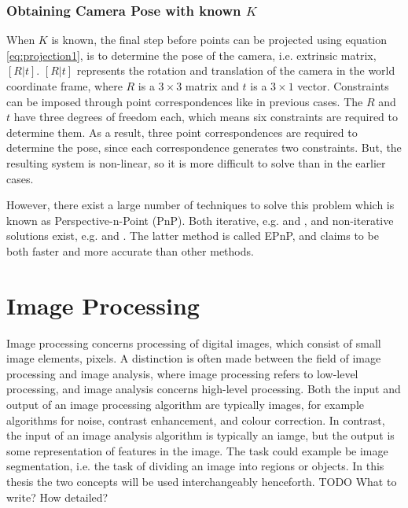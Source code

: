 \subsubsection{Obtaining Camera Pose with known $K$} \label{camera-pose}
When $K$ is known, the final step before points can be projected using equation \ref{eq:projection1}, is to determine the pose of the camera, i.e. extrinsic matrix, $[R|t]$. $[R|t]$ represents the rotation and translation of the camera in the world coordinate frame, where $R$ is a $3 \times 3$ matrix and $t$ is a $3 \times 1$ vector.
Constraints can be imposed through point correspondences like in previous cases.
The $R$ and $t$ have three degrees of freedom each, which means six constraints are required to determine them.
As a result, three point correspondences are required to determine the pose, since each correspondence generates two constraints.
But, the resulting system is non-linear, so it is more difficult to solve than in the earlier cases. \cite[187]{hartley-zisserman}

However, there exist a large number of techniques to solve this problem which is known as Perspective-n-Point (PnP). %
Both iterative, e.g. \cite{hesch-pnp} and \cite{oberkampf-pnp}, and non-iterative solutions exist, e.g. \cite{quan-pnp} and \cite{lepetit-pnp}.
The latter method is called EPnP, and claims to be both faster and more accurate than other methods. 

\section{Image Processing}
Image processing concerns processing of digital images, which consist of small image elements, pixels.
A distinction is often made between the field of image processing and image analysis, where image processing refers to low-level processing, and image analysis concerns high-level processing.
Both the input and output of an image processing algorithm are typically images, for example algorithms for noise, contrast enhancement, and colour correction. 
In contrast, the input of an image analysis algorithm is typically an iamge, but the output is some representation of features in the image.
The task could example be image segmentation, i.e. the task of dividing an image into regions or objects.\cite[p. 1-2]{pitas}\cite[p. 1-2]{gonzalez-woods}
In this thesis the two concepts will be used interchangeably henceforth.
TODO What to write? How detailed?%

















